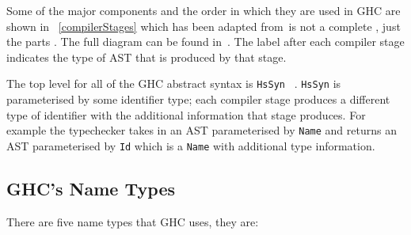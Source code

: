 Some of the major components and the order in which they are used in GHC are shown in \DIFdelbegin {}\DIFdelend \DIFaddbegin {}\DIFaddend ~\ref{compilerStages} which has been adapted from~\DIFdelbegin {}\DIFdelend \DIFaddbegin {}\DIFaddend is not a complete \DIFdelbegin {}\DIFdelend \DIFaddbegin {}\DIFaddend , just the parts \DIFdelbegin {}\DIFdelend \DIFaddbegin {}\DIFaddend . The full diagram can be found in~\citep{ghcDesign}. The label after each compiler stage indicates the type of AST that is produced by that stage.

The top level \DIFdelbegin {}\DIFdelend \DIFaddbegin {}\DIFaddend for all of the GHC abstract syntax is \texttt{HsSyn} ~\citep{ghcDesign}. \texttt{HsSyn} is parameterised by some identifier type; each compiler stage produces a different type of identifier with the additional information that stage produces. For example the typechecker takes in an AST parameterised by \texttt{Name} and returns an AST parameterised by \texttt{Id} which is a \texttt{Name} with additional type information.

\subsection{GHC's Name Types}\label{ghcNames}

There are five name types that GHC uses, they are:


